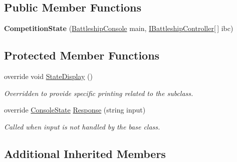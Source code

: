 \subsection*{Public Member Functions}
\begin{DoxyCompactItemize}
\item 
\hypertarget{class_m_b_c_1_1_terminal_1_1_competition_state_a30f9e150db2d951fc3844d9bb4d575c8}{{\bfseries Competition\-State} (\hyperlink{class_m_b_c_1_1_terminal_1_1_battleship_console}{Battleship\-Console} main, \hyperlink{interface_m_b_c_1_1_core_1_1_i_battleship_controller}{I\-Battleship\-Controller}\mbox{[}$\,$\mbox{]} ibc)}\label{class_m_b_c_1_1_terminal_1_1_competition_state_a30f9e150db2d951fc3844d9bb4d575c8}

\end{DoxyCompactItemize}
\subsection*{Protected Member Functions}
\begin{DoxyCompactItemize}
\item 
\hypertarget{class_m_b_c_1_1_terminal_1_1_competition_state_a910a4059941eca78c26368f33fc7ba40}{override void \hyperlink{class_m_b_c_1_1_terminal_1_1_competition_state_a910a4059941eca78c26368f33fc7ba40}{State\-Display} ()}\label{class_m_b_c_1_1_terminal_1_1_competition_state_a910a4059941eca78c26368f33fc7ba40}

\begin{DoxyCompactList}\small\item\em Overridden to provide specific printing related to the subclass.\end{DoxyCompactList}\item 
override \hyperlink{class_m_b_c_1_1_terminal_1_1_console_state}{Console\-State} \hyperlink{class_m_b_c_1_1_terminal_1_1_competition_state_a85808b20e9ecb90e400eb6dcbb5929fd}{Response} (string input)
\begin{DoxyCompactList}\small\item\em Called when input is not handled by the base class.\end{DoxyCompactList}\end{DoxyCompactItemize}
\subsection*{Additional Inherited Members}


